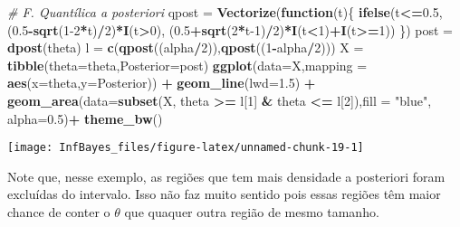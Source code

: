 \documentclass[
]{book}
\newenvironment{Shaded}{\begin{snugshade}}{\end{snugshade}}
\newcommand{\CommentTok}[1]{\textcolor[rgb]{0.56,0.35,0.01}{\textit{#1}}}
\newcommand{\ControlFlowTok}[1]{\textcolor[rgb]{0.13,0.29,0.53}{\textbf{#1}}}
\newcommand{\DataTypeTok}[1]{\textcolor[rgb]{0.13,0.29,0.53}{#1}}
\newcommand{\DecValTok}[1]{\textcolor[rgb]{0.00,0.00,0.81}{#1}}
\newcommand{\FloatTok}[1]{\textcolor[rgb]{0.00,0.00,0.81}{#1}}
\newcommand{\KeywordTok}[1]{\textcolor[rgb]{0.13,0.29,0.53}{\textbf{#1}}}
\newcommand{\NormalTok}[1]{#1}
\newcommand{\OperatorTok}[1]{\textcolor[rgb]{0.81,0.36,0.00}{\textbf{#1}}}
\newcommand{\StringTok}[1]{\textcolor[rgb]{0.31,0.60,0.02}{#1}}
\begin{document}
\begin{Shaded}
\begin{Highlighting}[]
\CommentTok{# F. Quantílica a posteriori}
\NormalTok{qpost =}\StringTok{ }\KeywordTok{Vectorize}\NormalTok{(}\ControlFlowTok{function}\NormalTok{(t)\{ }\KeywordTok{ifelse}\NormalTok{(t}\OperatorTok{<=}\FloatTok{0.5}\NormalTok{, (}\FloatTok{0.5}\OperatorTok{-}\KeywordTok{sqrt}\NormalTok{(}\DecValTok{1-2}\OperatorTok{*}\NormalTok{t)}\OperatorTok{/}\DecValTok{2}\NormalTok{)}\OperatorTok{*}\KeywordTok{I}\NormalTok{(t}\OperatorTok{>}\DecValTok{0}\NormalTok{),}
\NormalTok{    (}\FloatTok{0.5}\OperatorTok{+}\KeywordTok{sqrt}\NormalTok{(}\DecValTok{2}\OperatorTok{*}\NormalTok{t}\DecValTok{-1}\NormalTok{)}\OperatorTok{/}\DecValTok{2}\NormalTok{)}\OperatorTok{*}\KeywordTok{I}\NormalTok{(t}\OperatorTok{<}\DecValTok{1}\NormalTok{)}\OperatorTok{+}\KeywordTok{I}\NormalTok{(t}\OperatorTok{>=}\DecValTok{1}\NormalTok{)) \})}
\NormalTok{post =}\StringTok{ }\KeywordTok{dpost}\NormalTok{(theta)}
\NormalTok{l =}\StringTok{ }\KeywordTok{c}\NormalTok{(}\KeywordTok{qpost}\NormalTok{((alpha}\OperatorTok{/}\DecValTok{2}\NormalTok{)),}\KeywordTok{qpost}\NormalTok{((}\DecValTok{1}\OperatorTok{-}\NormalTok{alpha}\OperatorTok{/}\DecValTok{2}\NormalTok{)))}
\NormalTok{X =}\StringTok{ }\KeywordTok{tibble}\NormalTok{(}\DataTypeTok{theta=}\NormalTok{theta,}\DataTypeTok{Posterior=}\NormalTok{post)}
\KeywordTok{ggplot}\NormalTok{(}\DataTypeTok{data=}\NormalTok{X,}\DataTypeTok{mapping =} \KeywordTok{aes}\NormalTok{(}\DataTypeTok{x=}\NormalTok{theta,}\DataTypeTok{y=}\NormalTok{Posterior)) }\OperatorTok{+}
\StringTok{  }\KeywordTok{geom_line}\NormalTok{(}\DataTypeTok{lwd=}\FloatTok{1.5}\NormalTok{) }\OperatorTok{+}
\StringTok{  }\KeywordTok{geom_area}\NormalTok{(}\DataTypeTok{data=}\KeywordTok{subset}\NormalTok{(X, theta }\OperatorTok{>=}\StringTok{ }\NormalTok{l[}\DecValTok{1}\NormalTok{] }\OperatorTok{&}\StringTok{ }\NormalTok{theta }\OperatorTok{<=}\StringTok{ }\NormalTok{l[}\DecValTok{2}\NormalTok{]),}\DataTypeTok{fill =} \StringTok{"blue"}\NormalTok{, }\DataTypeTok{alpha=}\FloatTok{0.5}\NormalTok{)}\OperatorTok{+}
\StringTok{  }\KeywordTok{theme_bw}\NormalTok{()}
\end{Highlighting}
\end{Shaded}

\begin{center}\texttt{[image: InfBayes\_files/figure-latex/unnamed-chunk-19-1]} \end{center}

Note que, nesse exemplo, as regiões que tem mais densidade a posteriori foram excluídas do intervalo. Isso não faz muito sentido pois essas regiões têm maior chance de conter o \(\theta\) que quaquer outra região de mesmo tamanho.
\end{document}
